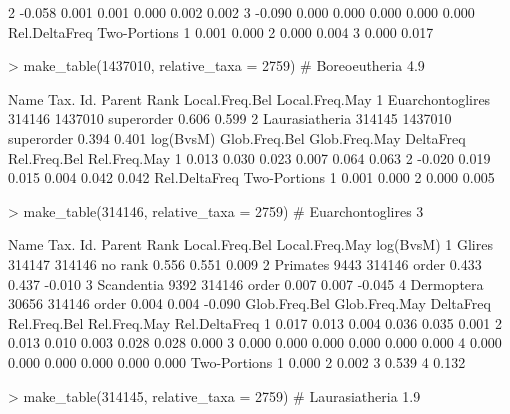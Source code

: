 \documentclass{article}
\begin{document}
\begin{Schunk}
\begin{Soutput}
2    -0.058         0.001         0.001     0.000        0.002        0.002
3    -0.090         0.000         0.000     0.000        0.000        0.000
  Rel.DeltaFreq Two-Portions
1         0.001        0.000
2         0.000        0.004
3         0.000        0.017
\end{Soutput}
\begin{Sinput}
> make_table(1437010, relative_taxa = 2759) # Boreoeutheria 4.9% B and 3.9% M
\end{Sinput}
\begin{Soutput}
              Name Tax. Id.  Parent       Rank Local.Freq.Bel Local.Freq.May
1 Euarchontoglires   314146 1437010 superorder          0.606          0.599
2   Laurasiatheria   314145 1437010 superorder          0.394          0.401
  log(BvsM) Glob.Freq.Bel Glob.Freq.May DeltaFreq Rel.Freq.Bel Rel.Freq.May
1     0.013         0.030         0.023     0.007        0.064        0.063
2    -0.020         0.019         0.015     0.004        0.042        0.042
  Rel.DeltaFreq Two-Portions
1         0.001        0.000
2         0.000        0.005
\end{Soutput}
\begin{Sinput}
> make_table(314146, relative_taxa = 2759) # Euarchontoglires   3% B and 2.3% M
\end{Sinput}
\begin{Soutput}
        Name Tax. Id. Parent    Rank Local.Freq.Bel Local.Freq.May log(BvsM)
1     Glires   314147 314146 no rank          0.556          0.551     0.009
2   Primates     9443 314146   order          0.433          0.437    -0.010
3 Scandentia     9392 314146   order          0.007          0.007    -0.045
4 Dermoptera    30656 314146   order          0.004          0.004    -0.090
  Glob.Freq.Bel Glob.Freq.May DeltaFreq Rel.Freq.Bel Rel.Freq.May Rel.DeltaFreq
1         0.017         0.013     0.004        0.036        0.035         0.001
2         0.013         0.010     0.003        0.028        0.028         0.000
3         0.000         0.000     0.000        0.000        0.000         0.000
4         0.000         0.000     0.000        0.000        0.000         0.000
  Two-Portions
1        0.000
2        0.002
3        0.539
4        0.132
\end{Soutput}
\begin{Sinput}
> make_table(314145, relative_taxa = 2759) # Laurasiatheria 1.9% B and 1.5% M (bats pangolin whale dolphin etc, relative_taxa = 2759)  
\end{Sinput}
\begin{Soutput}

\end{Soutput}
\end{Schunk}
\end{document}
